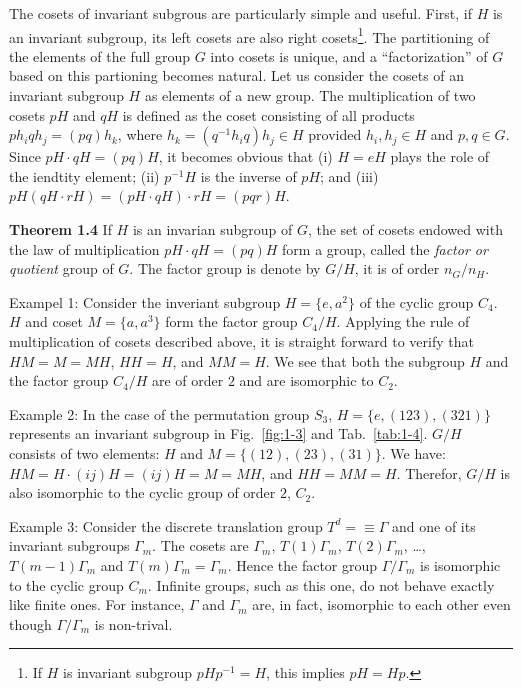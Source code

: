 The cosets of invariant subgrous are particularly simple and useful.
First, if $H$ is an invariant subgroup, its left cosets are also right cosets\footnote{If $H$ is invariant subgroup $p H p^{-1} = H$, this implies $pH = Hp$.}.
The partitioning of the elements of the full group $G$ into cosets is unique, and a ``factorization'' of $G$ based on this partioning becomes natural.
Let us consider the cosets of an invariant subgroup $H$ as elements of a new group.
The multiplication of two cosets $pH$ and $qH$ is defined as the coset consisting of all products $ph_{i}qh_{j} = \left(pq\right)h_{k}$, where $h_{k} = \left(q^{-1} h_{i} q \right) h_{j} \in H$ provided $h_{i},h_{j} \in H$ and $p,q \in G$.
Since $pH \cdot qH = \left(pq\right) H$, it becomes obvious that (i) $H=eH$ plays the role of the iendtity element; (ii) $p^{-1}H$ is the inverse of $pH$; and (iii) $pH \left(qH \cdot rH \right) = \left(p H \cdot qH \right) \cdot rH = \left(pqr\right) H$.

\textbf{Theorem 1.4} If $H$ is an invarian subgroup of $G$, the set of cosets endowed with the law of multiplication $pH \cdot qH = \left(pq\right)H$ form a group, called the \textit{factor or quotient} group of $G$.
The factor group is denote by $G/H$, it is of order $n_{G}/n_{H}$.

\textrm{Exampel 1}: Consider the inveriant subgroup $H= \{e, a^{2}\}$ of the cyclic group $C_{4}$.
$H$ and coset $M=\{a, a^{3}\}$ form the factor group $C_{4}/H$.
Applying the rule of multiplication of cosets described above, it is straight forward to verify that $HM = M = MH$, $HH = H$, and $MM = H$.
We see that both the subgroup $H$ and the factor group $C_{4}/H$ are of order $2$ and are isomorphic to $C_{2}$.

\textrm{Example 2}: In the case of the permutation group $S_{3}$, $H=\{e, \left(123\right), \left(321\right)\}$ represents an invariant subgroup in Fig.~\ref{fig:1-3} and Tab.~\ref{tab:1-4}.
$G/H$ consists of two elements: $H$ and $M=\{\left(12\right), \left(23\right), \left(31\right)\}$.
We have: $HM= H\cdot \left(ij\right)H= \left(ij\right) H = M = MH$, and $HH= MM = H$.
Therefor, $G/H$ is also isomorphic to the cyclic group of order $2$, $C_{2}$.

\textrm{Example 3}: Consider the discrete translation group $T^{d}=\equiv \Gamma$ and one of its invariant subgroups $\Gamma_{m}$.
The cosets are $\Gamma_{m}$, $T\left(1\right) \Gamma_{m}$, $T\left(2\right) \Gamma_{m}$, \ldots, $T\left(m-1\right) \Gamma_{m}$ and $T\left(m\right) \Gamma_{m} = \Gamma_{m}$.
Hence the factor group $\Gamma/\Gamma_{m}$ is isomorphic to the cyclic group $C_{m}$.
Infinite groups, such as this one, do not behave exactly like finite ones.
For instance, $\Gamma$  and $\Gamma_{m}$ are, in fact, isomorphic to each other even though $\Gamma/\Gamma_{m}$ is non-trival.

